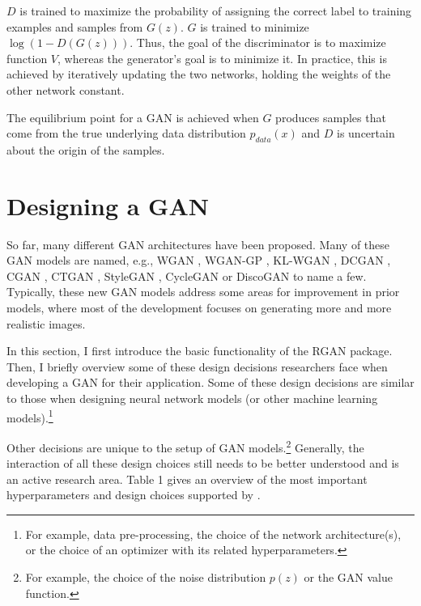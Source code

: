 \(D\) is trained to maximize the probability of assigning the correct label to training examples and samples from \(G(z)\). \(G\) is trained to minimize \(\log(1 - D(G(z)))\). Thus, the goal of the discriminator is to maximize function \(V\), whereas the generator's goal is to minimize it. In practice, this is achieved by iteratively updating the two networks, holding the weights of the other network constant.

The equilibrium point for a GAN is achieved when \(G\) produces samples that come from the true underlying data distribution \(p_{data}(x)\) and \(D\) is uncertain about the origin of the samples.

\section{Designing a GAN}\label{sec:design}

So far, many different GAN architectures have been proposed. Many of these GAN models are named, e.g., WGAN \citep{arjovsky2017}, WGAN-GP \citep{gulrajani2017}, KL-WGAN \citep{song2020bridging}, DCGAN \citep{radford2016}, CGAN \citep{mirza2014conditional}, CTGAN \citep{Xu2019}, StyleGAN \citep{Karras_2019_CVPR}, CycleGAN \citep{Zhu_2017_ICCV} or DiscoGAN \citep{Kim2017} to name a few. Typically, these new GAN models address some areas for improvement in prior models, where most of the development focuses on generating more and more realistic images.

In this section, I first introduce the basic functionality of the RGAN package. Then, I briefly overview some of these design decisions researchers face when developing a GAN for their application. Some of these design decisions are similar to those when designing neural network models (or other machine learning models).\footnote{For example, data pre-processing, the choice of the network
  architecture(s), or the choice of an optimizer with its related
  hyperparameters.}

Other decisions are unique to the setup of GAN models.\footnote{For example, the choice of the noise distribution \(p(z)\) or the
  GAN value function.} Generally, the interaction of all these design choices still needs to be better understood and is an active research area. Table 1 gives an overview of the most important hyperparameters and design choices supported by .

